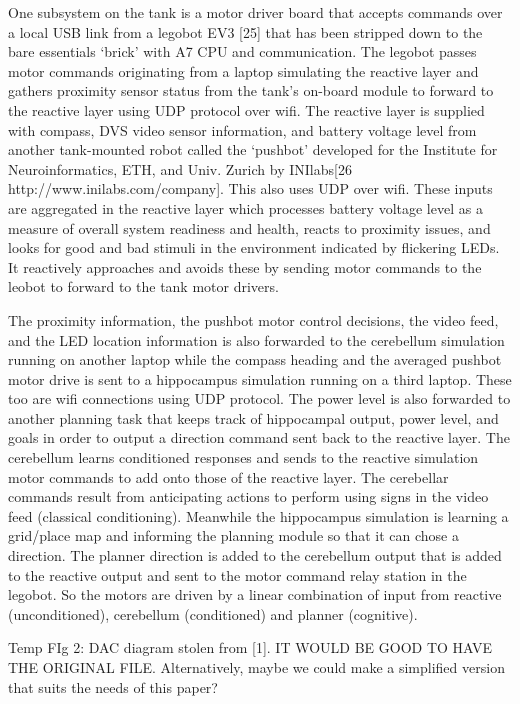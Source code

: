 One subsystem on the tank is a motor driver board that accepts commands
over a local USB link from a legobot EV3 {[}25{]} that has been stripped
down to the bare essentials \textquoteleft{}brick\textquoteright{}
with A7 CPU and communication. The legobot passes motor commands originating
from a laptop simulating the reactive layer and gathers proximity
sensor status from the tank's on-board module to forward to the reactive
layer using UDP protocol over wifi. The reactive layer is supplied
with compass, DVS video sensor information, and battery voltage level
from another tank-mounted robot called the \textquoteleft{}pushbot\textquoteright{}
developed for the Institute for Neuroinformatics, ETH, and Univ. Zurich
by INIlabs{[}26 http://www.inilabs.com/company{]}. This also uses
UDP over wifi. These inputs are aggregated in the reactive layer which
processes battery voltage level as a measure of overall system readiness
and health, reacts to proximity issues, and looks for good and bad
stimuli in the environment indicated by flickering LEDs. It reactively
approaches and avoids these by sending motor commands to the leobot
to forward to the tank motor drivers.

The proximity information, the pushbot motor control decisions, the
video feed, and the LED location information is also forwarded to
the cerebellum simulation running on another laptop while the compass
heading and the averaged pushbot motor drive is sent to a hippocampus
simulation running on a third laptop. These too are wifi connections
using UDP protocol. The power level is also forwarded to another planning
task that keeps track of hippocampal output, power level, and goals
in order to output a direction command sent back to the reactive layer.
The cerebellum learns conditioned responses and sends to the reactive
simulation motor commands to add onto those of the reactive layer.
The cerebellar commands result from anticipating actions to perform
using signs in the video feed (classical conditioning). Meanwhile
the hippocampus simulation is learning a grid/place map and informing
the planning module so that it can chose a direction. The planner
direction is added to the cerebellum output that is added to the reactive
output and sent to the motor command relay station in the legobot.
So the motors are driven by a linear combination of input from reactive
(unconditioned), cerebellum (conditioned) and planner (cognitive).

Temp FIg 2: DAC diagram stolen from {[}1{]}. IT WOULD BE GOOD TO HAVE
THE ORIGINAL FILE. Alternatively, maybe we could make a simplified
version that suits the needs of this paper?

